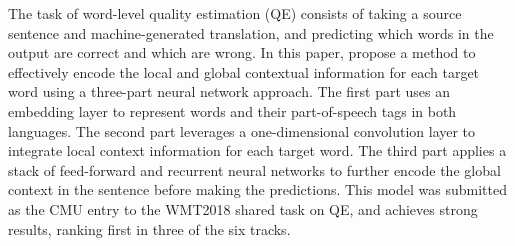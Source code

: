 The task of word-level quality estimation (QE) consists of taking a source sentence and machine-generated translation, and predicting which words in the output are correct and which are wrong. In this paper, propose a method to effectively encode the local and global contextual information for each target word using a three-part neural network approach. The first part uses an embedding layer to represent words and their part-of-speech tags in both languages. The second part leverages a one-dimensional convolution layer to integrate local context information for each target word. The third part applies a stack of feed-forward and recurrent neural networks to further encode the global context in the sentence before making the predictions. This model was submitted as the CMU entry to the WMT2018 shared task on QE, and achieves strong results, ranking first in three of the six tracks.
